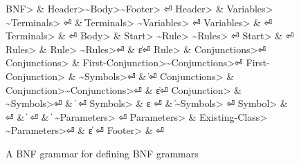 \begin{figure}[ht]
  \begin{Grammar}
    \begin{aligned}
      \<BNF>                & \Derives \<Header>\~\<Body>\~\<Footer> \hfill⏎
      \<Header>             & \Derives \<Variables> \~\<Terminals> \hfill⏎
      {}                    & \| \<Terminals> \~\<Variables> \hfill⏎
      \<Variables>          & \Derives {}\hfill⏎
      \<Terminals>          & \Derives {}\hfill⏎
      \<Body>               & \Derives \<Start> \~\<Rule> \~ \<Rules> \hfill⏎
      \<Start>              & \Derives {} \hfill⏎
      \<Rules>              & \Derives \<Rule> \~\<Rules>\hfill⏎
      {}                    & \| ε\hfill⏎
      \<Rule>               & \Derives {} \<Conjunctions>\hfill⏎
      \<Conjunctions>       & \Derives \<First-Conjunction>\~\<Conjunctions>\hfill⏎
      \<First-Conjunction>  & \Derives {}\~\<Symbols>\hfill⏎
      {}                    & \| \hfill⏎
      \<Conjunctions> & \Derives \<Conjunction>\~\<Conjunctions>\hfill⏎
      {}                    & \| ε\hfill⏎
      \<Conjunction>  & \Derives {}\~\<Symbols>\hfill⏎
      {}                    & \|  \hfill⏎
      \<Symbols>    & \Derives ε \hfill⏎
      {}                    & \| \~\<Symbols> \hfill⏎
      \<Symbol>             & \Derives {} \hfill⏎
      {}                    & \|  \hfill⏎
      {}                    & \|  \~ \<Parameters> \hfill⏎
      \<Parameters>         & \Derives \cc{,} \<Existing-Class> \~ \<Parameters>\hfill⏎
      {}                    & \| ε \hfill⏎
      \<Footer>             & \Derives {}\hfill⏎
    \end{aligned}
  \end{Grammar}
  \caption{A BNF grammar for defining BNF grammars}
  \label{figure:BNF:BNF}
\end{figure}
